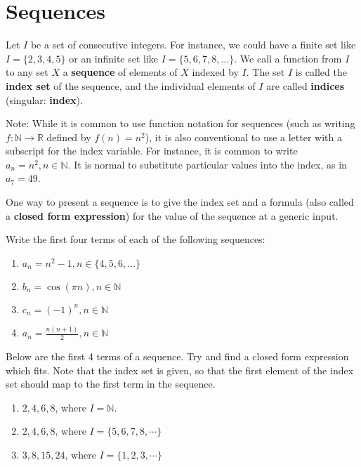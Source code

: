 \section{Sequences}

\begin{definition}
	Let $I$ be a set of consecutive integers.  For instance, we could have a finite set like $I = \{2,3,4,5\}$ or an infinite set like $I = \{5, 6, 7, 8, \dots\}$.  We call a function from $I$ to any set $X$ a \textbf{sequence} of elements of $X$ indexed by $I$.  The set $I$ is called the \textbf{index set} of the sequence, and the individual elements of $I$ are called \textbf{indices} (singular:  \textbf{index}).
\end{definition}

Note:  While it is common to use function notation for sequences (such as writing $f: \mathbb{N} \to \mathbb{R}$ defined by $f(n) = n^2$), it is also conventional to use a letter with a subscript for the index variable.  For instance, it is common to write $a_n = n^2, n \in \mathbb{N}$.  It is normal to substitute particular values into the index, as in $a_7  =49$.

One way to present a sequence is to give the index set and a formula (also called a \textbf{closed form expression}) for the value of the sequence at a generic input.

\begin{xca}
		Write the first four terms of each of the following sequences:
		
		\begin{enumerate}
				\item $a_n = n^2 -1, n \in \{4,5,6,\dots\}$
				\item $b_n = \cos(\pi n), n \in \mathbb{N}$
				\item $c_n = (-1)^n, n \in \mathbb{N}$
				\item $a_n = \frac{n(n+1)}{2}, n \in \mathbb{N}$
			\end{enumerate}
	\end{xca}

\begin{xca}
	Below are the first 4 terms of a sequence.  Try and find a closed form expression which fits.  Note that the index set is given, so that the first element of the index set should map to the first term in the sequence.
	
	\begin{enumerate}
		\item $2, 4, 6, 8$, where  $I = \mathbb{N}$.
		\item $2, 4, 6, 8$,  where $I = \{5, 6, 7, 8, \cdots\}$
		\item $3, 8, 15, 24$, where $I = \{1,2,3, \cdots\}$
	\end{enumerate}
\end{xca}


